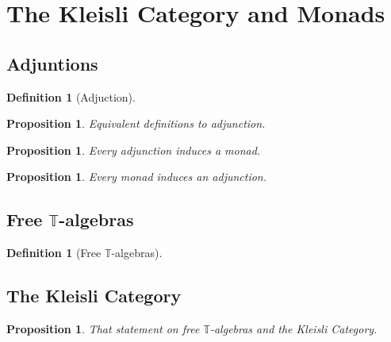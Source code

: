 \documentclass[a4paper]{article}
\theoremstyle{plain}
\newtheorem{proposition}[theorem]{Proposition}
\theoremstyle{definition}
\newtheorem{definition}[theorem]{Definition}
\newcommand{\cat}[1]{\mathcal{#1}}
\begin{document}

\section{The Kleisli Category and Monads}
\subsection{Adjuntions}
\begin{definition}[Adjuction]
\end{definition}
\begin{proposition}
    Equivalent definitions to adjunction.
\end{proposition}
\begin{proposition}
    Every adjunction induces a monad.
\end{proposition}
\begin{proposition}
    Every monad induces an adjunction.
\end{proposition}
\subsection{Free $\mathbb{T}$-algebras}
\begin{definition}[Free $\mathbb{T}$-algebras]
\end{definition}
\subsection{The Kleisli Category}
\begin{proposition}
    That statement on free $\mathbb{T}$-algebras and the Kleisli Category.
\end{proposition}
\end{document}
